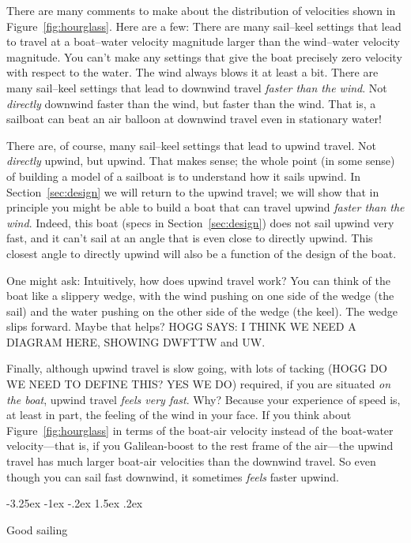 \documentclass[letterpaper]{article}
\makeatletter
\newcommand{\secref}[1]{Section~\ref{#1}}
\newcommand{\figref}[1]{Figure~\ref{#1}}
\renewcommand\section{\@startsection {section}{1}{\z@}%
  {-3.25ex \@plus -1ex \@minus -.2ex}%
  {1.5ex \@plus .2ex}%
  {\raggedright\normalfont\large\bfseries}}
\makeatother
\begin{document}
There are many comments to make about the distribution of velocities shown in \figref{fig:hourglass}.
Here are a few:
There are many sail--keel settings that lead to travel at a boat--water velocity magnitude larger than the wind--water velocity magnitude.
You can't make any settings that give the boat precisely zero velocity with respect to the water.
The wind always blows it at least a bit.
There are many sail--keel settings that lead to downwind travel \emph{faster than the wind}.
Not \emph{directly} downwind faster than the wind, but faster than the wind.
That is, a sailboat can beat an air balloon at downwind travel even in stationary water!

There are, of course, many sail--keel settings that lead to upwind travel.
Not \emph{directly} upwind, but upwind.
That makes sense; the whole point (in some sense) of building a model of a sailboat is to understand how it sails upwind.
In \secref{sec:design} we will return to the upwind travel; we will show that in principle you might be able to build a boat that can travel upwind \emph{faster than the wind}.
Indeed, this boat (specs in \secref{sec:design}) does not sail upwind very fast, and it can't sail at an angle that is even close to directly upwind.
This closest angle to directly upwind will also be a function of the design of the boat.

One might ask: Intuitively, how does upwind travel work?
You can think of the boat like a slippery wedge, with the wind pushing on one side of the wedge (the sail) and the water pushing on the other side of the wedge (the keel).
The wedge slips forward.
Maybe that helps?
HOGG SAYS: I THINK WE NEED A DIAGRAM HERE, SHOWING DWFTTW and UW.

Finally, although upwind travel is slow going, with lots of tacking (HOGG DO WE NEED TO DEFINE THIS? YES WE DO) required, if you are situated \emph{on the boat}, upwind travel \emph{feels very fast}.
Why?
Because your experience of speed is, at least in part, the feeling of the wind in your face.
If you think about \figref{fig:hourglass} in terms of the boat-air velocity instead of the boat-water velocity---that is, if you Galilean-boost to the rest frame of the air---the upwind travel has much larger boat-air velocities than the downwind travel.
So even though you can sail fast downwind, it sometimes \emph{feels} faster upwind.

\section{Good sailing}\label{sec:good}
\end{document}
